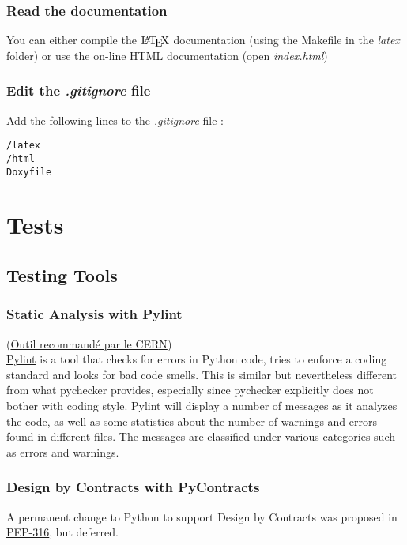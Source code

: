 \documentclass[a4paper]{report}
\begin{document}
\subsection{Read the documentation\\}
You can either compile the $\mbox{\LaTeX}$ documentation (using the Makefile in the \emph{latex} folder) or use the on-line HTML documentation (open \emph{index.html})

\subsection{Edit the \emph{.gitignore} file}
Add the following lines to the \emph{.gitignore} file : 
\begin{verbatim}
/latex
/html
Doxyfile
\end{verbatim}



\chapter{Tests}
\section{Testing Tools}
\subsection{Static Analysis with Pylint}
(\href{https://security.web.cern.ch/security/recommendations/fr/code_tools.shtml}{Outil recommandé par le CERN})\\
\href{https://www.pylint.org}{Pylint} is a tool that checks for errors in Python code, tries to enforce a coding standard and looks for bad code smells. This is similar but nevertheless different from what pychecker provides, especially since pychecker explicitly does not bother with coding style. Pylint will display a number of messages as it analyzes the code, as well as some statistics about the number of warnings and errors found in different files. The messages are classified under various categories such as errors and warnings.

	
\subsection{Design by Contracts with PyContracts}
A permanent change to Python to support Design by Contracts was proposed in \href{https://www.python.org/dev/peps/pep-0316/}{PEP-316}, but deferred.\\
\end{document}
